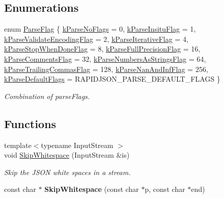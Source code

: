 \subsection*{Enumerations}
\begin{DoxyCompactItemize}
\item 
enum \hyperlink{a00563_ab7be7dabe6ffcba60fad441505583450}{Parse\+Flag} \{ \newline
\hyperlink{a00563_ab7be7dabe6ffcba60fad441505583450a1af603dc5f65bb815316589e782bc71a}{k\+Parse\+No\+Flags} = 0, 
\hyperlink{a00563_ab7be7dabe6ffcba60fad441505583450a13188bd483b4df0b6582bebe2aeb5b01}{k\+Parse\+Insitu\+Flag} = 1, 
\hyperlink{a00563_ab7be7dabe6ffcba60fad441505583450a9b3baa16346575d2dc072b23a88e1928}{k\+Parse\+Validate\+Encoding\+Flag} = 2, 
\hyperlink{a00563_ab7be7dabe6ffcba60fad441505583450aadb14f5a3b6b33e28055e913a2eae5e9}{k\+Parse\+Iterative\+Flag} = 4, 
\newline
\hyperlink{a00563_ab7be7dabe6ffcba60fad441505583450af77d115d3bbed0a448b6b335f3b93b36}{k\+Parse\+Stop\+When\+Done\+Flag} = 8, 
\hyperlink{a00563_ab7be7dabe6ffcba60fad441505583450a057fbeacafb16bb7d24c9998262cae46}{k\+Parse\+Full\+Precision\+Flag} = 16, 
\hyperlink{a00563_ab7be7dabe6ffcba60fad441505583450a245d1b6af730f47f0e7bd27078f5e8c1}{k\+Parse\+Comments\+Flag} = 32, 
\hyperlink{a00563_ab7be7dabe6ffcba60fad441505583450aa951ab03a51b32b60164436bc280cf01}{k\+Parse\+Numbers\+As\+Strings\+Flag} = 64, 
\newline
\hyperlink{a00563_ab7be7dabe6ffcba60fad441505583450a953d6381de950e25c8c97ad54f52370a}{k\+Parse\+Trailing\+Commas\+Flag} = 128, 
\hyperlink{a00563_ab7be7dabe6ffcba60fad441505583450a9849d65c1d3edd796bd75897c6a37eb6}{k\+Parse\+Nan\+And\+Inf\+Flag} = 256, 
\hyperlink{a00563_ab7be7dabe6ffcba60fad441505583450a9104b0946d648e9467cb7a967401ec80}{k\+Parse\+Default\+Flags} = R\+A\+P\+I\+D\+J\+S\+O\+N\+\_\+\+P\+A\+R\+S\+E\+\_\+\+D\+E\+F\+A\+U\+L\+T\+\_\+\+F\+L\+A\+GS
 \}\begin{DoxyCompactList}\small\item\em Combination of parse\+Flags. \end{DoxyCompactList}
\end{DoxyCompactItemize}
\subsection*{Functions}
\begin{DoxyCompactItemize}
\item 
{\footnotesize template$<$typename Input\+Stream $>$ }\\void \hyperlink{a00563_a60338858b2582eca23f3e509a2d82e0e}{Skip\+Whitespace} (Input\+Stream \&is)
\begin{DoxyCompactList}\small\item\em Skip the J\+S\+ON white spaces in a stream. \end{DoxyCompactList}\item 
\mbox{\label{a00563_a64051745304fce07e8b95a71776bab92}} 
const char $\ast$ {\bfseries Skip\+Whitespace} (const char $\ast$p, const char $\ast$end)
\end{DoxyCompactItemize}


